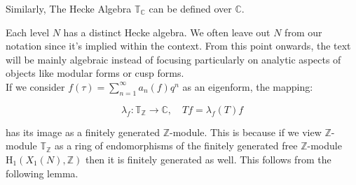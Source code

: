 Similarly, The Hecke Algebra    $\mathbb{T}_{\mathbb{C}}$ can be defined over $\mathbb{C}$.

Each level $N$ 
 has a distinct Hecke algebra. We often leave out $N$ from our notation since it's implied within the context. From this point onwards, 
the text will be mainly algebraic instead of focusing particularly on analytic aspects of objects like modular forms or cusp forms. \\

 If we consider $f(\tau)=\sum_{n=1}^{\infty} a_{n}(f) q^{n}$ as an eigenform, the mapping:

$$
\lambda_{f}: \mathbb{T}_{\mathbb{Z}} \longrightarrow \mathbb{C}, \quad T f=\lambda_{f}(T) f
$$

has its image as a finitely generated $\mathbb{Z}$-module. This is because if we view $\mathbb{Z}$-module $\mathbb{T}_{\mathbb{Z}}$ as a ring of endomorphisms of the finitely generated free $\mathbb{Z}$-module $\mathrm{H}_{1}\left(X_{1}(N), \mathbb{Z}\right)$ then it is finitely generated as well. This follows from the following lemma. 

